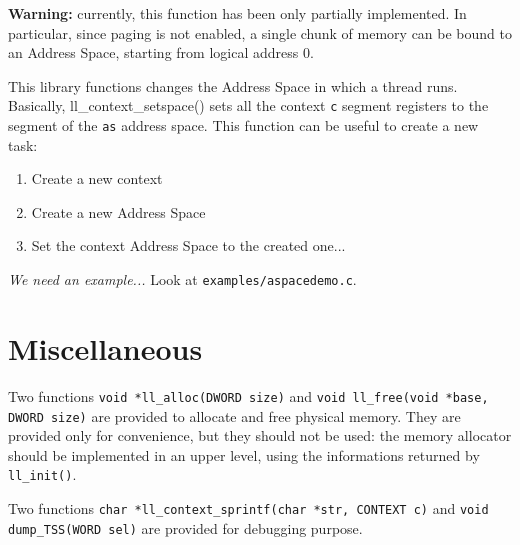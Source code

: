 \documentclass[a4paper]{report}
\begin{document}
{\bf Warning:} currently, this function has been only partially implemented.
In particular, since paging is not enabled, a single chunk of memory can be
bound to an Address Space, starting from logical address 0.


This library functions changes the Address Space in which a thread runs.
Basically, {ll\_context\_setspace()} sets all the context {\tt c} segment
registers to the segment of the {\tt as} address space.
This function can be useful to create a new task: \begin{enumerate}
\item Create a new context
\item Create a new Address Space
\item Set the context Address Space to the created one...
\end{enumerate}
{\em We need an example...} Look at {\tt examples/aspacedemo.c}.

\section{Miscellaneous}
Two functions {\tt void *ll\_alloc(DWORD size)} and
{\tt void ll\_free(void *base, DWORD size)} are provided to
allocate and free physical memory. They are provided only for
convenience, but they should not be used: the memory allocator
should be implemented in an upper level, using the informations
returned by {\tt ll\_init()}.

Two functions {\tt char *ll\_context\_sprintf(char *str, CONTEXT c)} and
{\tt void dump\_TSS(WORD sel)} are provided for debugging purpose.
\end{document}
